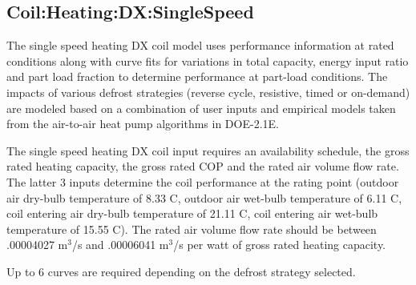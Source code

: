\subsection{Coil:Heating:DX:SingleSpeed}\label{coilheatingdxsinglespeed}

The single speed heating DX coil model uses performance information at rated conditions along with curve fits for variations in total capacity, energy input ratio and part load fraction to determine performance at part-load conditions. The impacts of various defrost strategies (reverse cycle, resistive, timed or on-demand) are modeled based on a combination of user inputs and empirical models taken from the air-to-air heat pump algorithms in DOE-2.1E.

The single speed heating DX coil input requires an availability schedule, the gross rated heating capacity, the gross rated COP and the rated air volume flow rate. The latter 3 inputs determine the coil performance at the rating point (outdoor air dry-bulb temperature of 8.33 C, outdoor air wet-bulb temperature of 6.11 C, coil entering air dry-bulb temperature of 21.11 C, coil entering air wet-bulb temperature of 15.55 C). The rated air volume flow rate should be between .00004027 m\(^{3}\)/s and .00006041 m\(^{3}\)/s per watt of gross rated heating capacity.

Up to 6 curves are required depending on the defrost strategy selected.

